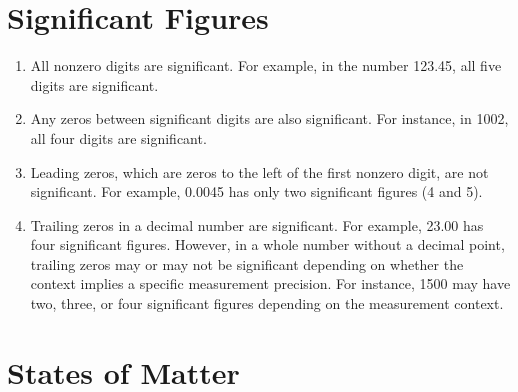 \documentclass[10pt, roman]{article}
\begin{document}
\section{Significant Figures}

\begin{enumerate}
    \item All nonzero digits are significant.
    For example, in the number 123.45, all five digits are significant.
    \item Any zeros between significant digits are also significant.
    For instance, in 1002, all four digits are significant.
    \item Leading zeros, which are zeros to the left of the first nonzero digit, are not significant.
    For example, 0.0045 has only two significant figures (4 and 5).
    \item Trailing zeros in a decimal number are significant.
    For example, 23.00 has four significant figures.
    However, in a whole number without a decimal point, trailing zeros may or may not be significant depending on whether the context implies a specific measurement precision.
    For instance, 1500 may have two, three, or four significant figures depending on the measurement context.
\end{enumerate}

\section{States of Matter}
\end{document}
